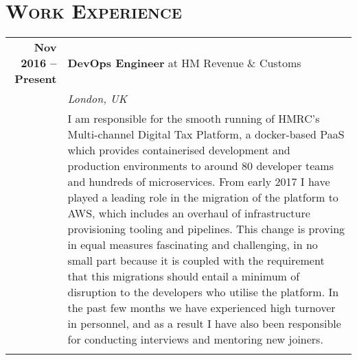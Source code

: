 \documentclass[a4paper,10pt]{article} %
\begin{document}
\section{\textsc{Work Experience}}
\centering
\begin{tabularx}{\textwidth}{r|X}
\textbf{Nov 2016 -- Present}        & \textbf{DevOps Engineer} at HM Revenue \& Customs \\
                                    & \emph{London, UK} \\
                                    & \footnotesize{I am responsible for
                                    the smooth running of HMRC’s Multi-channel
                                    Digital Tax Platform, a docker-based PaaS
                                    which provides containerised development and
                                    production environments to around 80
                                    developer teams and hundreds of
                                    microservices. From early 2017 I have played
                                    a leading role in the migration of the
                                    platform to AWS, which includes an overhaul
                                    of infrastructure provisioning tooling and
                                    pipelines. This change is proving in equal
                                    measures fascinating and challenging, in no
                                    small part because it is coupled with the
                                    requirement that this migrations should
                                    entail a minimum of disruption to the
                                    developers who utilise the platform. In the
                                    past few months we have experienced high
                                    turnover in personnel, and as a result I
                                    have also been responsible for conducting
                                    interviews and mentoring new joiners.} \\

\multicolumn{2}{r}{} \\ %


\end{tabularx}
\end{document}

